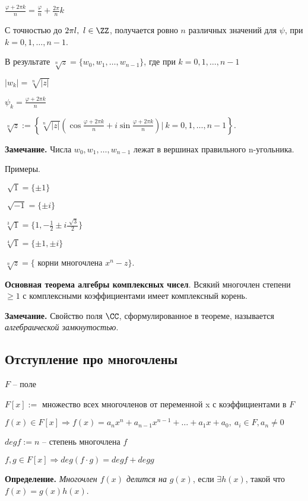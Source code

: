 $\frac{\varphi + 2 \pi k}{n} = \frac{\varphi}{n} + \frac{2 \pi}{n} k$

С точностью до $2 \pi l, \ l \in \ZZ$, получается ровно $n$ различных значений для $\psi$, при $k = 0,1, \dots, n-1$.

В результате $\sqrt[n]{z} = \{w_0, w_1, \dots, w_{n-1} \}$, где при $k = 0, 1, \dots, n-1$ 

$|w_k| = \sqrt[n]{|z|}$

$\psi_k = \frac{\varphi + 2 \pi k}{n}$

\bigskip
$\sqrt[n]{z} := \left\{ \sqrt[n]{|z|} \left( \cos \frac{\varphi + 2 \pi k}{n} + i \sin \frac{\varphi + 2 \pi k}{n} \right) | \ k = 0, 1, \dots, n-1  \right\}$.

\bigskip
\textbf{Замечание.} Числа $w_0, w_1, \dots, w_{n-1}$ лежат в вершинах правильного n-угольника.

\bigskip
Примеры. 

$\sqrt[]{1} = \{\pm 1\}$

$\sqrt[]{-1} = \{\pm i\}$

$\sqrt[3]{1} = \{1, -\frac{1}{2} \pm i \frac{\sqrt[]{3}}{2} \}$

$\sqrt[4]{1} = \{ \pm 1, \pm i \}$

\bigskip
$\sqrt[n]{z} = \{$ корни многочлена $x^n - z \}$.

\bigskip
\textbf{Основная теорема алгебры комплексных чисел}. Всякий многочлен степени $\geq 1$ с комплексными коэффициентами имеет комплексный корень.

\bigskip
\textbf{Замечание.} Свойство поля $\CC$, сформулированное в теореме, называется \textit{алгебраической замкнутостью}.

\subsection{Отступление про многочлены}

$F$ -- поле

$F[x] :=$ множество всех многочленов от переменной x с коэффициентами в $F$

$f(x) \in F[x] \Rightarrow f(x) = a_n x^n + a_{n-1} x^{n-1}+ \dots + a_1 x + a_0, \ a_i \in F, a_n \neq 0$

$deg f := n$ -- степень многочлена $f$

$f, g \in F[x] \Rightarrow deg(f \cdot g) = degf + deg g$

\bigskip
\textbf{Определение.} \textit{Многочлен $f(x)$ делится на} $g(x)$, если $\exists h(x)$, такой что $f(x) = g(x) h(x)$.

